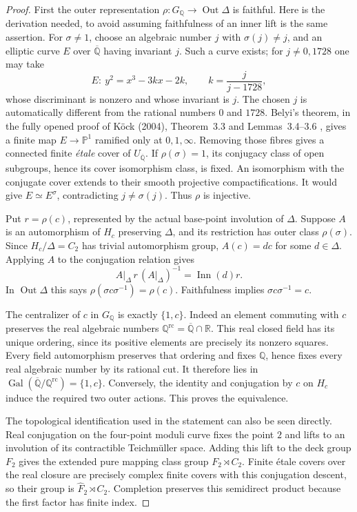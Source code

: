 \begin{proof}
First the outer representation
$\rho:G_{\mathbb Q}\to\operatorname{Out}\Delta$ is faithful. Here is
the derivation needed, to avoid assuming faithfulness of an inner
lift is the same assertion. For $\sigma\ne1$, choose an algebraic
number $j$ with $\sigma(j)\ne j$, and an elliptic curve $E$ over
$\overline{\mathbb Q}$ having invariant $j$. Such a curve exists; for
$j\ne0,1728$ one may take
\[
 E:\ y^2=x^3-3kx-2k,\qquad k=\frac{j}{j-1728},
\]
whose discriminant is nonzero and whose invariant is $j$.
The chosen $j$ is automatically different from the rational numbers
$0$ and $1728$. Belyi's theorem, in the fully opened proof of
K\"ock (2004), Theorem~3.3 and Lemmas~3.4--3.6
\cite{A567_Kock2004}, gives a finite map
$E\to\mathbb P^1$ ramified only at $0,1,\infty$. Removing those fibres
gives a connected finite \emph{\'etale} cover of $U_{\overline{\mathbb Q}}$.
If $\rho(\sigma)=1$, its conjugacy class of open subgroups, hence its
cover isomorphism class, is fixed. An isomorphism with the conjugate
cover extends to their smooth projective compactifications. It would
give $E\simeq E^\sigma$, contradicting $j\ne\sigma(j)$. Thus $\rho$
is injective.

Put $r=\rho(c)$, represented by the actual base-point involution of
$\Delta$. Suppose $A$ is an automorphism of $H_c$ preserving $\Delta$,
and its restriction has outer class $\rho(\sigma)$. Since
$H_c/\Delta=C_2$ has trivial automorphism group, $A(c)=d c$ for some
$d\in\Delta$. Applying $A$ to the conjugation relation gives
\[
 A|_\Delta\, r\,(A|_\Delta)^{-1}=\operatorname{Inn}(d)r.
\]
In $\operatorname{Out}\Delta$ this says
$\rho(\sigma c\sigma^{-1})=\rho(c)$. Faithfulness implies
$\sigma c\sigma^{-1}=c$.

The centralizer of $c$ in $G_{\mathbb Q}$ is exactly $\{1,c\}$.
Indeed an element commuting with $c$ preserves the real algebraic
numbers $\mathbb Q^{\mathrm{rc}}=\overline{\mathbb Q}\cap\mathbb R$.
This real closed field has its unique ordering, since its positive
elements are precisely its nonzero squares. Every field automorphism
preserves that ordering and fixes $\mathbb Q$, hence fixes every real
algebraic number by its rational cut. It therefore lies in
$\operatorname{Gal}(\overline{\mathbb Q}/\mathbb Q^{\mathrm{rc}})
=\{1,c\}$. Conversely, the identity and conjugation by $c$ on $H_c$
induce the required two outer actions. This proves the equivalence.

The topological identification used in the statement can also be
seen directly. Real conjugation on the four-point moduli curve fixes
the point $2$ and lifts to an involution of its contractible
Teichm\"uller space. Adding this lift to the deck group $F_2$ gives
the extended pure mapping class group $F_2\rtimes C_2$. Finite
\'etale covers over the real closure are precisely complex finite
covers with this conjugation descent, so their group is
$\widehat F_2\rtimes C_2$. Completion preserves this semidirect
product because the first factor has finite index.


\end{proof}
